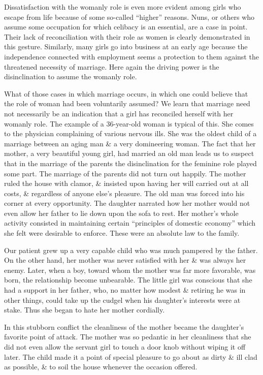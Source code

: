 \documentclass{article}
\begin{document}
Dissatisfaction with the womanly role is even more evident among girls who escape from life because of some so-called ``higher'' reasons. Nuns, or others who assume some occupation for which celibacy is an essential, are a case in point. Their lack of reconciliation with their role as women is clearly demonstrated in this gesture. Similarly, many girls go into business at an early age because the independence connected with employment seems a protection to them against the threatened necessity of marriage. Here again the driving power is the disinclination to assume the womanly role.

What of those cases in which marriage occurs, in which one could believe that the role of woman had been voluntarily assumed? We learn that marriage need not necessarily be an indication that a girl has reconciled herself with her womanly role. The example of a 36-year-old woman is typical of this. She comes to the physician complaining of various nervous ills. She was the oldest child of a marriage between an aging man \& a very domineering woman. The fact that her mother, a very beautiful young girl, had married an old man leads us to suspect that in the marriage of the parents the disinclination for the feminine role played some part. The marriage of the parents did not turn out happily. The mother ruled the house with clamor, \& insisted upon having her will carried out at all costs, \& regardless of anyone else's pleasure. The old man was forced into his corner at every opportunity. The daughter narrated how her mother would not even allow her father to lie down upon the sofa to rest. Her mother's whole activity consisted in maintaining certain ``principles of domestic economy'' which she felt were desirable to enforce. These were an absolute law to the family.

Our patient grew up a very capable child who was much pampered by the father. On the other hand, her mother was never satisfied with her \& was always her enemy. Later, when a boy, toward whom the mother was far more favorable, was born, the relationship become unbearable. The little girl was conscious that she had a support in her father, who, no matter how modest \& retiring he was in other things, could take up the cudgel when his daughter's interests were at stake. Thus she began to hate her mother cordially.

In this stubborn conflict the cleanliness of the mother became the daughter's favorite point of attack. The mother was so pedantic in her cleanliness that she did not even allow the servant girl to touch a door knob without wiping it off later. The child made it a point of special pleasure to go about as dirty \& ill clad as possible, \& to soil the house whenever the occasion offered.
\end{document}
